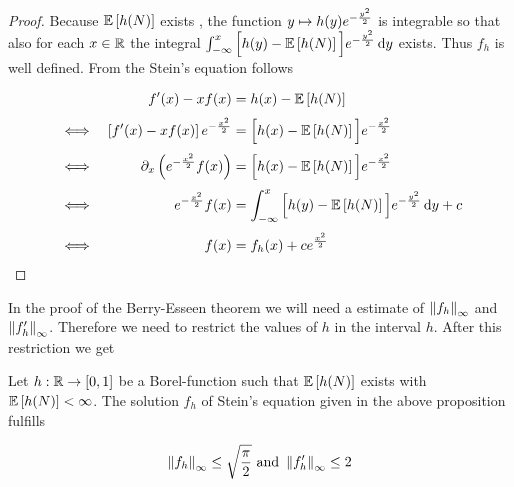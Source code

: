 \begin{proof}
   Because $\mathbb E\left[{h(N)}\right]$ exists , the function $y\mapsto h(y)e^{-\frac{y^2}{2}}$ is integrable so that also for each $x\in\mathbb R$ the integral ${\int_{-\infty}^x \Big[h(y)-\mathbb E\left[{h(N)}\right]\Big]e^{-\frac{y^2}{2}}\,\mathrm d{y}}$ exists. Thus $f_h$ is well defined. From the Stein's equation follows

  \begin{align}
    &      & f'(x)-xf(x) & = h(x) - \E{h(N)} \nl
    & \iff & \left[ f'(x) - xf(x) \right] \e{-\frac{x^2}{2}} &= \Big[h(x) - \E{h(N)}\Big] \e{-\frac{x^2}{2}} \nl
    & \iff & \partial_x \left( \e{-\frac{x^2}2} f(x) \right) &= \Big[h(x) - \E{h(N)}\Big] \e{-\frac{x^2}{2}} \nl
    & \iff & \e{-\frac{x^2}{2}} f(x) & = \int_{-\infty}^x \Big[ h(y) - \E{h(N)} \Big] \e{-\frac{y^2}{2}} \d{y} + c \nl
    & \iff & f(x) & = f_h(x) + c \e{\frac{x^2}{2}}
  \end{align}
\end{proof}

In the proof of the Berry-Esseen theorem we will need a estimate of $\left\|{f_h}\right\|_\infty$ and $\left\|{f_h'}\right\|_\infty$. Therefore we need to restrict the values of $h$ in the interval $h$. After this restriction we get

\begin{proposition}
  Let $h:\mathbb R \to [0,1]$ be a Borel-function such that $\mathbb E\left[{h(N)}\right]$ exists with $\mathbb E\left[{h(N)}\right]<\infty$. The solution $f_h$ of Stein's equation given in the above proposition fulfills

  \begin{align}
    \left\|{f_h}\right\|_\infty \le \sqrt{\frac \pi2} \text{ and } \left\|{f_h'}\right\|_\infty \le 2
  \end{align}
\end{proposition}

